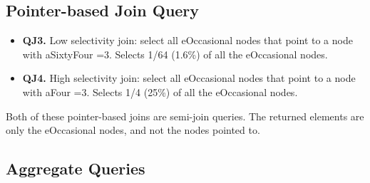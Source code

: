 \subsection{Pointer-based Join Query}
\begin {itemize}
\item {\bf QJ3.} Low selectivity join: select all {\sf eOccasional} nodes that point to a node with {\sf
aSixtyFour =3}.  Selects 1/64 (1.6\%) of all the {\sf eOccasional} nodes.
\item {\bf QJ4.} High selectivity join: select all {\sf eOccasional} nodes that point to a node with {\sf aFour
=3}.  Selects 1/4 (25\%) of all the {\sf eOccasional} nodes.
\end{itemize}
Both of these pointer-based joins are semi-join queries.  The returned
elements are only the {\sf eOccasional} nodes, and not the nodes pointed to.

\subsection{Aggregate Queries}

